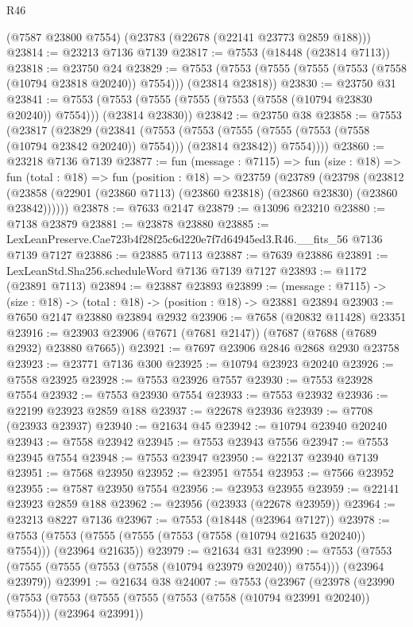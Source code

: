 \begin{lexlean}{R46}
\begin{coremodule}
    (@7587 @23800 @7554)
    (@23783 (@22678 (@22141 @23773 @2859 @188)))
@23814 := @23213 @7136 @7139
@23817 := @7553 (@18448 (@23814 @7113))
@23818 := @23750 @24
@23829 := @7553 (@7553 (@7555 (@7555 (@7553 (@7558 (@10794 @23818 @20240)) @7554))) (@23814 @23818))
@23830 := @23750 @31
@23841 := @7553 (@7553 (@7555 (@7555 (@7553 (@7558 (@10794 @23830 @20240)) @7554))) (@23814 @23830))
@23842 := @23750 @38
@23858 := @7553
    (@23817
      (@23829
        (@23841
          (@7553
            (@7553 (@7555 (@7555 (@7553 (@7558 (@10794 @23842 @20240)) @7554))) (@23814 @23842))
            @7554))))
@23860 := @23218 @7136 @7139
@23877 := fun (message : @7115) =>
  fun (size : @18) =>
  fun (total : @18) =>
  fun (position : @18) =>
  @23759
    (@23789
      (@23798
        (@23812 (@23858 (@22901 (@23860 @7113) (@23860 @23818) (@23860 @23830) (@23860 @23842))))))
@23878 := @7633 @2147
@23879 := @13096 @23210
@23880 := @7138 @23879
@23881 := @23878 @23880
@23885 := LexLeanPreserve.Cae723b4f28f25c6d220e7f7d64945ed3.R46.__fits_56 @7136 @7139 @7127
@23886 := @23885 @7113
@23887 := @7639 @23886
@23891 := LexLeanStd.Sha256.scheduleWord @7136 @7139 @7127
@23893 := @1172 (@23891 @7113)
@23894 := @23887 @23893
@23899 := (message : @7115) -> (size : @18) -> (total : @18) -> (position : @18) -> @23881 @23894
@23903 := @7650 @2147 @23880 @23894 @2932
@23906 := @7658 (@20832 @11428) @23351
@23916 := @23903 @23906 (@7671 (@7681 @2147)) (@7687 (@7688 (@7689 @2932) @23880 @7665))
@23921 := @7697 @23906 @2846 @2868 @2930 @23758
@23923 := @23771 @7136 @300
@23925 := @10794 @23923 @20240
@23926 := @7558 @23925
@23928 := @7553 @23926 @7557
@23930 := @7553 @23928 @7554
@23932 := @7553 @23930 @7554
@23933 := @7553 @23932
@23936 := @22199 @23923 @2859 @188
@23937 := @22678 @23936
@23939 := @7708 (@23933 @23937)
@23940 := @21634 @45
@23942 := @10794 @23940 @20240
@23943 := @7558 @23942
@23945 := @7553 @23943 @7556
@23947 := @7553 @23945 @7554
@23948 := @7553 @23947
@23950 := @22137 @23940 @7139
@23951 := @7568 @23950
@23952 := @23951 @7554
@23953 := @7566 @23952
@23955 := @7587 @23950 @7554
@23956 := @23953 @23955
@23959 := @22141 @23923 @2859 @188
@23962 := @23956 (@23933 (@22678 @23959))
@23964 := @23213 @8227 @7136
@23967 := @7553 (@18448 (@23964 @7127))
@23978 := @7553 (@7553 (@7555 (@7555 (@7553 (@7558 (@10794 @21635 @20240)) @7554))) (@23964 @21635))
@23979 := @21634 @31
@23990 := @7553 (@7553 (@7555 (@7555 (@7553 (@7558 (@10794 @23979 @20240)) @7554))) (@23964 @23979))
@23991 := @21634 @38
@24007 := @7553
    (@23967
      (@23978
        (@23990
          (@7553
            (@7553 (@7555 (@7555 (@7553 (@7558 (@10794 @23991 @20240)) @7554))) (@23964 @23991))

\end{coremodule}
\end{lexlean}
